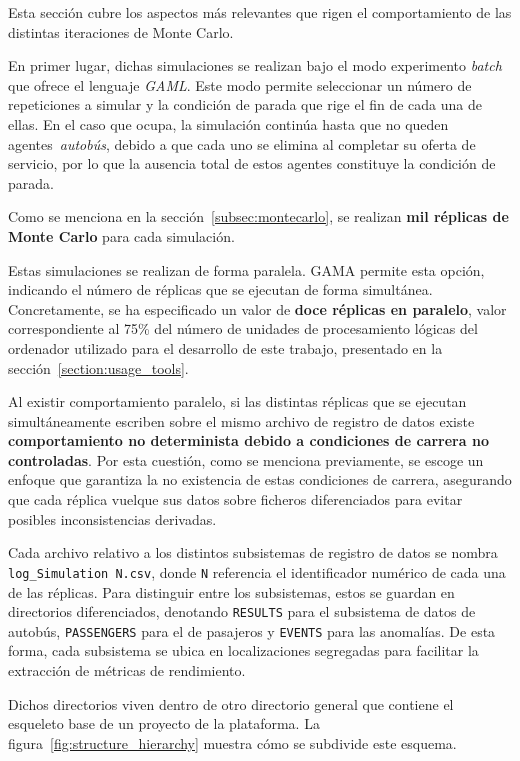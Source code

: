 Esta sección cubre los aspectos más relevantes que rigen el comportamiento de las distintas iteraciones de Monte Carlo.

En primer lugar, dichas simulaciones se realizan bajo el modo experimento \textit{batch} que ofrece el lenguaje \textit{GAML}.
Este modo permite seleccionar un número de repeticiones a simular y la condición de parada que rige el fin de cada una de ellas.
En el caso que ocupa, la simulación continúa hasta que no queden agentes~\textit{autobús}, debido a que cada uno 
se elimina al completar su oferta de servicio, por lo que la ausencia total de estos agentes constituye la condición de parada.

Como se menciona en la sección~\ref{subsec:montecarlo}, se realizan \textbf{mil réplicas de Monte Carlo} para cada simulación.

Estas simulaciones se realizan de forma paralela. GAMA permite esta opción, indicando el número de réplicas que se
ejecutan de forma simultánea. Concretamente, se ha especificado un valor de \textbf{doce réplicas en paralelo},
valor correspondiente al 75\% del número de unidades de procesamiento lógicas del ordenador utilizado para el desarrollo de este trabajo,
presentado en la sección~\ref{section:usage_tools}.

Al existir comportamiento paralelo, si las distintas réplicas que se ejecutan simultáneamente escriben sobre el mismo archivo
de registro de datos existe \textbf{comportamiento no determinista debido a condiciones de carrera no controladas}. Por esta cuestión,
como se menciona previamente, se escoge un enfoque que garantiza la no existencia de estas condiciones de carrera, asegurando que 
cada réplica vuelque sus datos sobre ficheros diferenciados para evitar posibles inconsistencias derivadas.

Cada archivo relativo a los distintos subsistemas de registro de datos se nombra \\
\texttt{log\_Simulation N.csv}, donde \texttt{N} referencia
el identificador numérico de cada una de las réplicas. Para distinguir entre los subsistemas, estos se guardan en directorios
diferenciados, denotando \texttt{RESULTS} para el subsistema de datos de autobús, \texttt{PASSENGERS} para el de pasajeros y
\texttt{EVENTS} para las anomalías. De esta forma, cada subsistema se ubica en localizaciones segregadas para facilitar
la extracción de métricas de rendimiento.

Dichos directorios viven dentro de otro directorio general que contiene el esqueleto base de un proyecto de la plataforma.
La figura~\ref{fig:structure_hierarchy} muestra cómo se subdivide este esquema.

